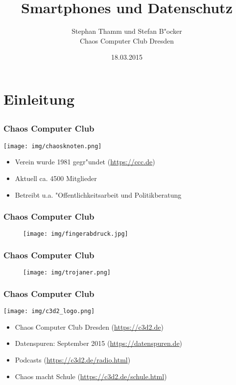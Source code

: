 \documentclass[12pt]{beamer}
\title{Smartphones und Datenschutz}
\author{\small Stephan Thamm und Stefan B"ocker\\\large Chaos Computer Club Dresden}
\date{18.03.2015}
\begin{document}
\maketitle


\section{Einleitung}
\subsection{}

\begin{frame}
    \frametitle{Chaos Computer Club}
    \begin{center}
	\texttt{[image: img/chaosknoten.png]}
    \end{center}	
    \begin{itemize}
      \item<1-> Verein wurde 1981 gegr"undet (\url{https://ccc.de})          
      \item<2-> Aktuell ca. 4500 Mitglieder
      \item<3-> Betreibt u.a. "Offentlichkeitsarbeit und Politikberatung      
    \end{itemize}
\end{frame}

\begin{frame}
  \frametitle{Chaos Computer Club}
  \begin{figure}
    \texttt{[image: img/fingerabdruck.jpg]}
  \end{figure}
\end{frame}

\begin{frame}
  \frametitle{Chaos Computer Club}
  \begin{figure}
    \texttt{[image: img/trojaner.png]}
  \end{figure}
\end{frame}

\begin{frame}
    \frametitle{Chaos Computer Club}
    \begin{center}
	\texttt{[image: img/c3d2\_logo.png]}
    \end{center}
    \begin{itemize}
      \item<1-> Chaos Computer Club Dresden (\url{https://c3d2.de})          
      \item<2-> Datenspuren: September 2015 (\url{https://datenspuren.de})
      \item<3-> Podcasts (\url{https://c3d2.de/radio.html})
      \item<4-> Chaos macht Schule (\url{https://c3d2.de/schule.html})
    \end{itemize}
\end{frame}
\end{document}
